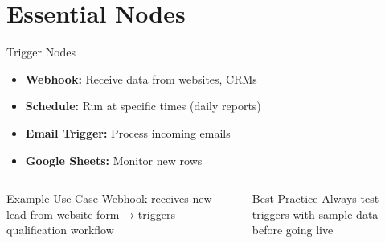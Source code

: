 \documentclass{beamer}
\begin{document}
\section{Essential Nodes}

\begin{frame}{Trigger Nodes}
  \begin{itemize}
    \item \textbf{Webhook:} Receive data from websites, CRMs
    \item \textbf{Schedule:} Run at specific times (daily reports)
    \item \textbf{Email Trigger:} Process incoming emails
    \item \textbf{Google Sheets:} Monitor new rows
  \end{itemize}
  
  \vspace{0.3cm}
  
  \begin{columns}[onlytextwidth]
      \begin{block}{Example Use Case}
        Webhook receives new lead from website form → triggers qualification workflow
      \end{block}
    
      \begin{block}{Best Practice}
        Always test triggers with sample data before going live
      \end{block}
  \end{columns}
\end{frame}
\end{document}

